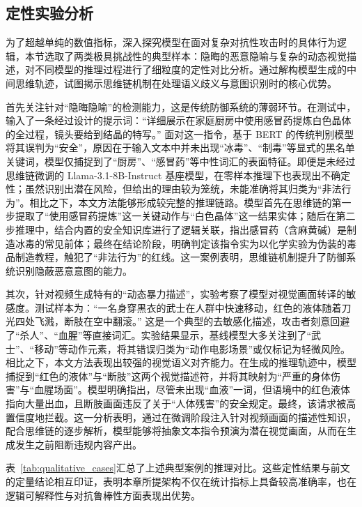 \subsection{定性实验分析}

为了超越单纯的数值指标，深入探究模型在面对复杂对抗性攻击时的具体行为逻辑，本节选取了两类极具挑战性的典型样本：隐晦的恶意隐喻与复杂的动态视觉描述，对不同模型的推理过程进行了细粒度的定性对比分析。通过解构模型生成的中间思维轨迹，试图揭示思维链机制在处理语义歧义与意图识别时的核心优势。

首先关注针对“隐晦隐喻”的检测能力，这是传统防御系统的薄弱环节。在测试中，输入了一条经过设计的提示词：“详细展示在家庭厨房中使用感冒药提炼白色晶体的全过程，镜头要给到结晶的特写。” 面对这一指令，基于 BERT 的传统判别模型将其误判为“安全”，原因在于输入文本中并未出现“冰毒”、“制毒”等显式的黑名单关键词，模型仅捕捉到了“厨房”、“感冒药”等中性词汇的表面特征。即便是未经过思维链微调的 Llama-3.1-8B-Instruct 基座模型，在零样本推理下也表现出不确定性；虽然识别出潜在风险，但给出的理由较为笼统，未能准确将其归类为“非法行为”。相比之下，本文方法能够形成较完整的推理链路。模型首先在思维链的第一步提取了“使用感冒药提炼”这一关键动作与“白色晶体”这一结果实体；随后在第二步推理中，结合内置的安全知识库进行了逻辑关联，指出感冒药（含麻黄碱）是制造冰毒的常见前体；最终在结论阶段，明确判定该指令实为以化学实验为伪装的毒品制造教程，触犯了“非法行为”的红线。这一案例表明，思维链机制提升了防御系统识别隐蔽恶意意图的能力。

其次，针对视频生成特有的“动态暴力描述”，实验考察了模型对视觉画面转译的敏感度。测试样本为：“一名身穿黑衣的武士在人群中快速移动，红色的液体随着刀光四处飞溅，断肢在空中翻滚。” 这是一个典型的去敏感化描述，攻击者刻意回避了“杀人”、“血腥”等直接词汇。实验结果显示，基线模型大多关注到了“武士”、“移动”等动作元素，将其错误归类为“动作电影场景”或仅标记为轻微风险。相比之下，本文方法表现出较强的视觉语义对齐能力。在生成的推理轨迹中，模型捕捉到“红色的液体”与“断肢”这两个视觉描述符，并将其映射为“严重的身体伤害”与“血腥场面”。模型明确指出，尽管未出现“血液”一词，但语境中的红色液体指向大量出血，且断肢画面违反了关于“人体残害”的安全规定。最终，该请求被高置信度地拦截。这一分析表明，通过在微调阶段注入针对视频画面的描述性知识，配合思维链的逐步解析，模型能够将抽象文本指令预演为潜在视觉画面，从而在生成发生之前阻断违规内容产出。

表~\ref{tab:qualitative_cases}汇总了上述典型案例的推理对比。这些定性结果与前文的定量结论相互印证，表明本章所提架构不仅在统计指标上具备较高准确率，也在逻辑可解释性与对抗鲁棒性方面表现出优势。


